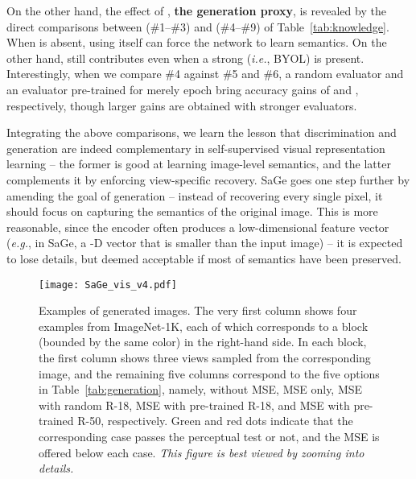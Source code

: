 \documentclass[10pt,twocolumn,letterpaper]{article}
\begin{document}
On the other hand, the effect of , \textbf{the generation proxy}, is revealed by the direct comparisons between (\#1--\#3) and (\#4--\#9) of Table~\ref{tab:knowledge}. When  is absent, using  itself can force the network to learn semantics. On the other hand,  still contributes even when a strong  (\textit{i.e.}, BYOL) is present. Interestingly, when we compare \#4 against \#5 and \#6, a random evaluator and an evaluator pre-trained for merely  epoch bring accuracy gains of  and , respectively, though larger gains are obtained with stronger evaluators.

Integrating the above comparisons, we learn the lesson that discrimination and generation are indeed complementary in self-supervised visual representation learning -- the former is good at learning image-level semantics, and the latter complements it by enforcing view-specific recovery. SaGe goes one step further by amending the goal of generation -- instead of recovering every single pixel, it should focus on capturing the semantics of the original image. This is more reasonable, since the encoder often produces a low-dimensional feature vector (\textit{e.g.}, in SaGe, a -D vector that is  smaller than the input image) -- it is expected to lose details, but deemed acceptable if most of semantics have been preserved.

\begin{figure*}
\centering
\texttt{[image: SaGe\_vis\_v4.pdf]}
\caption{Examples of generated images. The very first column shows four examples from ImageNet-1K, each of which corresponds to a block (bounded by the same color) in the right-hand side. In each block, the first column shows three views sampled from the corresponding image, and the remaining five columns correspond to the five options in Table~\ref{tab:generation}, namely, without MSE, MSE only, MSE with random R-18, MSE with pre-trained R-18, and MSE with pre-trained R-50, respectively. Green and red dots indicate that the corresponding case passes the perceptual test or not, and the MSE is offered below each case. \textit{This figure is best viewed by zooming into details.}}
\label{fig:visualization}
\end{figure*}
\end{document}
